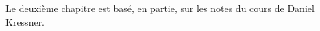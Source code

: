 \documentclass[a4paper,11pt,french]{scrbook}
\theoremstyle{plain}
\theoremstyle{definition}
\begin{document}
Le deuxième   chapitre est basé, en partie, sur les notes du cours de Daniel Kressner.  

\tableofcontents


 








\end{document}
